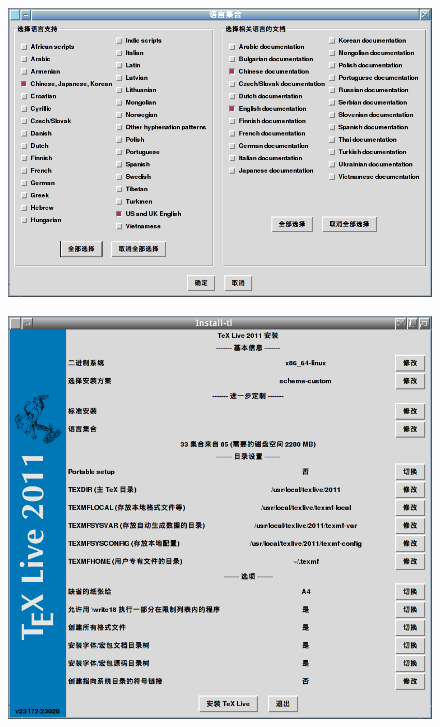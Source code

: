 \documentclass{beamer}
\begin{document}
\begin{frame}
  \begin{figure}[h]
  \centering
\includegraphics[scale=0.4]{语言集合.png}
  \end{figure}
\end{frame}

\begin{frame}
  \begin{figure}[h]
  \centering
\includegraphics[scale=0.35]{main-customed.png}
  \end{figure}
\end{frame}
\end{document}
